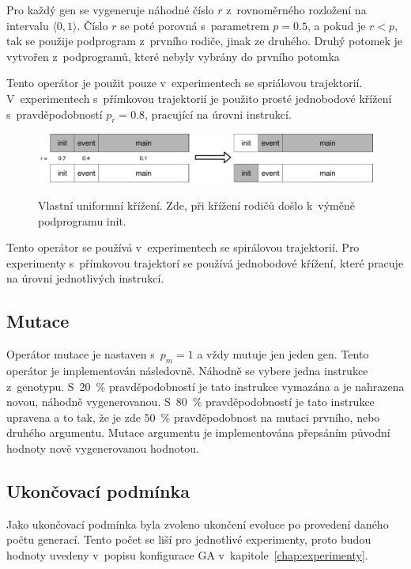 Pro každý gen se vygeneruje náhodné číslo $r$ z~rovnoměrného rozložení na intervalu $\langle 0, 1\rangle$.
Číslo $r$ se poté porovná s~parametrem $p = 0.5$, a pokud je $r < p$, tak se použije podprogram z~prvního rodiče, jinak ze druhého.
Druhý potomek je vytvořen z~podprogramů, které nebyly vybrány do prvního potomka

Tento operátor je použit pouze v~experimentech se spriálovou trajektorií.
V~experimentech s~přímkovou trajektorií je použito prosté jednobodové křížení s~pravděpodobností $p_r = 0.8$, pracující na úrovni instrukcí.

\begin{figure}[h]
    \centering
    {\includegraphics[width=35em]{obrazky/krizeni_podprogramu.pdf}}
    \caption[Vlastní uniformní křížení]{
    Vlastní uniformní křížení.
    Zde, při křížení rodičů došlo k~výměně podprogramu init.
    }
    \label{fig:krizeni_podprogramu}
\end{figure}

Tento operátor se používá v~experimentech se spirálovou trajektorií.
Pro experimenty s~přímkovou trajektorí se používá jednobodové křížení, které pracuje na úrovni jednotlivých instrukcí.

\subsection{Mutace}
Operátor mutace je nastaven s~$p_m = 1$ a vždy mutuje jen jeden gen.
Tento operátor je implementován následovně.
Náhodně se vybere jedna instrukce z~genotypu.
S~20~\% pravděpodobností je tato instrukce vymazána a je nahrazena novou, náhodně vygenerovanou.
S~80~\% pravděpodobností je tato instrukce upravena a to tak, že je zde 50~\% pravděpodobnost na mutaci prvního, nebo druhého argumentu.
Mutace argumentu je implementována přepsáním původní hodnoty nově vygenerovanou hodnotou.


\subsection{Ukončovací podmínka}
Jako ukončovací podmínka byla zvoleno ukončení evoluce po provedení daného počtu generací.
Tento počet se liší pro jednotlivé experimenty, proto budou hodnoty uvedeny v~popisu konfigurace GA v~kapitole~\ref{chap:experimenty}.


